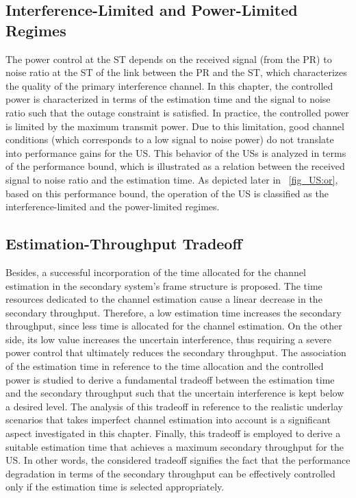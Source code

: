 \subsection{Interference-Limited and Power-Limited Regimes}
The power control at the ST depends on the received signal (from the PR) to noise ratio at the ST of the link between the PR and the ST, which characterizes the quality of the primary interference channel. In this chapter, the controlled power is characterized in terms of the estimation time and the signal to noise ratio such that the outage constraint is satisfied. In practice, the controlled power is limited by the maximum transmit power. Due to this limitation, good channel conditions (which corresponds to a low signal to noise power) do not translate into performance gains for the US. This behavior of the USs is analyzed in terms of the performance bound, which is illustrated as a relation between the received signal to noise ratio and the estimation time. As depicted later in \figurename~\ref{fig_US:or}, based on this performance bound, the operation of the US is classified as the interference-limited and the power-limited regimes.

\subsection{Estimation-Throughput Tradeoff}
Besides, a successful incorporation of the time allocated for the channel estimation in the secondary system's frame structure is proposed. The time resources dedicated to the channel estimation cause a linear decrease in the secondary throughput. Therefore, a low estimation time increases the secondary throughput, since less time is allocated for the channel estimation. On the other side, its low value increases the uncertain interference, thus requiring a severe power control that ultimately reduces the secondary throughput. The association of the estimation time in reference to the time allocation and the controlled power is studied to derive a fundamental tradeoff between the estimation time and the secondary throughput such that the uncertain interference is kept below a desired level. The analysis of this tradeoff in reference to the realistic underlay scenarios that takes imperfect channel estimation into account is a significant aspect investigated in this chapter. Finally, this tradeoff is employed to derive a suitable estimation time that achieves a maximum secondary throughput for the US. In other words, the considered tradeoff signifies the fact that the performance degradation in terms of the secondary throughput can be effectively controlled only if the estimation time is selected appropriately.

